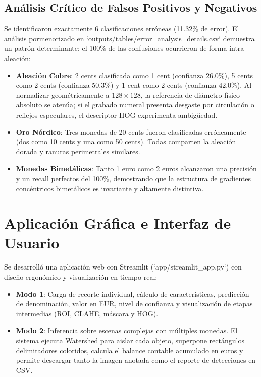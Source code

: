 \documentclass[journal,compsoc,twoside]{IEEEtran}
\begin{document}
\subsection{Análisis Crítico de Falsos Positivos y Negativos}
Se identificaron exactamente 6 clasificaciones erróneas (11.32\% de error). El análisis pormenorizado en `outputs/tables/error_analysis_details.csv` demuestra un patrón determinante: el 100\% de las confusiones ocurrieron de forma intra-aleación:
\begin{itemize}
    \item \textbf{Aleación Cobre}: 2 cents clasificada como 1 cent (confianza 26.0\%), 5 cents como 2 cents (confianza 50.3\%) y 1 cent como 2 cents (confianza 42.0\%). Al normalizar geométricamente a $128 \times 128$, la referencia de diámetro físico absoluto se atenúa; si el grabado numeral presenta desgaste por circulación o reflejos especulares, el descriptor HOG experimenta ambigüedad.
    \item \textbf{Oro Nórdico}: Tres monedas de 20 cents fueron clasificadas erróneamente (dos como 10 cents y una como 50 cents). Todas comparten la aleación dorada y ranuras perimetrales similares.
    \item \textbf{Monedas Bimetálicas}: Tanto 1 euro como 2 euros alcanzaron una precisión y un recall perfectos del 100\%, demostrando que la estructura de gradientes concéntricos bimetálicos es invariante y altamente distintiva.
\end{itemize}

\section{Aplicación Gráfica e Interfaz de Usuario}
Se desarrolló una aplicación web con Streamlit (`app/streamlit_app.py`) con diseño ergonómico y visualización en tiempo real:
\begin{itemize}
    \item \textbf{Modo 1}: Carga de recorte individual, cálculo de características, predicción de denominación, valor en EUR, nivel de confianza y visualización de etapas intermedias (ROI, CLAHE, máscara y HOG).
    \item \textbf{Modo 2}: Inferencia sobre escenas complejas con múltiples monedas. El sistema ejecuta Watershed para aislar cada objeto, superpone rectángulos delimitadores coloridos, calcula el balance contable acumulado en euros y permite descargar tanto la imagen anotada como el reporte de detecciones en CSV.
\end{itemize}
\end{document}
